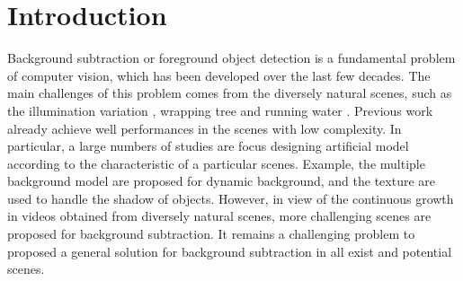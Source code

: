 \documentclass[journal]{IEEEtran}
\begin{document}
\section{Introduction}
Background subtraction or foreground object detection is a fundamental problem of computer vision, 
which has been developed over the last few decades.
The main challenges of this problem comes from the diversely natural scenes,
such as the illumination variation \cite{2017_REVIEW_7914756}, wrapping tree \cite{2014_CVIU_SOBRAL20144} and running water \cite{Bouwmans2014}.
Previous work already achieve well performances in the scenes with low complexity.
In particular,
a large numbers of studies are focus designing artificial model according to the characteristic of a particular scenes.
Example, the multiple background model are proposed for dynamic background,
and the texture are used to handle the shadow of objects.
However,
in view of
the continuous growth in videos obtained from diversely natural scenes,
more challenging scenes are proposed for background subtraction.
It remains a challenging problem to proposed a general solution for background subtraction in all exist and potential scenes.
%
% 
% 
% 
% 


\end{document}
